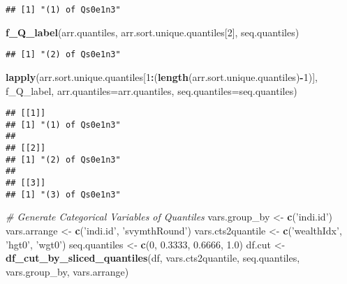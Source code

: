 \documentclass[
]{book}
\newenvironment{Shaded}{\begin{snugshade}}{\end{snugshade}}
\newcommand{\CommentTok}[1]{\textcolor[rgb]{0.56,0.35,0.01}{\textit{#1}}}
\newcommand{\DataTypeTok}[1]{\textcolor[rgb]{0.13,0.29,0.53}{#1}}
\newcommand{\DecValTok}[1]{\textcolor[rgb]{0.00,0.00,0.81}{#1}}
\newcommand{\FloatTok}[1]{\textcolor[rgb]{0.00,0.00,0.81}{#1}}
\newcommand{\KeywordTok}[1]{\textcolor[rgb]{0.13,0.29,0.53}{\textbf{#1}}}
\newcommand{\NormalTok}[1]{#1}
\newcommand{\OperatorTok}[1]{\textcolor[rgb]{0.81,0.36,0.00}{\textbf{#1}}}
\newcommand{\StringTok}[1]{\textcolor[rgb]{0.31,0.60,0.02}{#1}}
\begin{document}
\begin{verbatim}
## [1] "(1) of Qs0e1n3"
\end{verbatim}

\begin{Shaded}
\begin{Highlighting}[]
\KeywordTok{f_Q_label}\NormalTok{(arr.quantiles, arr.sort.unique.quantiles[}\DecValTok{2}\NormalTok{], seq.quantiles)}
\end{Highlighting}
\end{Shaded}

\begin{verbatim}
## [1] "(2) of Qs0e1n3"
\end{verbatim}

\begin{Shaded}
\begin{Highlighting}[]
\KeywordTok{lapply}\NormalTok{(arr.sort.unique.quantiles[}\DecValTok{1}\OperatorTok{:}\NormalTok{(}\KeywordTok{length}\NormalTok{(arr.sort.unique.quantiles)}\OperatorTok{-}\DecValTok{1}\NormalTok{)],}
\NormalTok{       f_Q_label,}
       \DataTypeTok{arr.quantiles=}\NormalTok{arr.quantiles,}
       \DataTypeTok{seq.quantiles=}\NormalTok{seq.quantiles)}
\end{Highlighting}
\end{Shaded}

\begin{verbatim}
## [[1]]
## [1] "(1) of Qs0e1n3"
## 
## [[2]]
## [1] "(2) of Qs0e1n3"
## 
## [[3]]
## [1] "(3) of Qs0e1n3"
\end{verbatim}

\begin{Shaded}
\begin{Highlighting}[]
\CommentTok{# Generate Categorical Variables of Quantiles}
\NormalTok{vars.group_by <-}\StringTok{ }\KeywordTok{c}\NormalTok{(}\StringTok{'indi.id'}\NormalTok{)}
\NormalTok{vars.arrange <-}\StringTok{ }\KeywordTok{c}\NormalTok{(}\StringTok{'indi.id'}\NormalTok{, }\StringTok{'svymthRound'}\NormalTok{)}
\NormalTok{vars.cts2quantile <-}\StringTok{ }\KeywordTok{c}\NormalTok{(}\StringTok{'wealthIdx'}\NormalTok{, }\StringTok{'hgt0'}\NormalTok{, }\StringTok{'wgt0'}\NormalTok{)}
\NormalTok{seq.quantiles <-}\StringTok{ }\KeywordTok{c}\NormalTok{(}\DecValTok{0}\NormalTok{, }\FloatTok{0.3333}\NormalTok{, }\FloatTok{0.6666}\NormalTok{, }\FloatTok{1.0}\NormalTok{)}
\NormalTok{df.cut <-}\StringTok{ }\KeywordTok{df_cut_by_sliced_quantiles}\NormalTok{(df, vars.cts2quantile, seq.quantiles, vars.group_by, vars.arrange)}
\end{Highlighting}
\end{Shaded}
\end{document}
